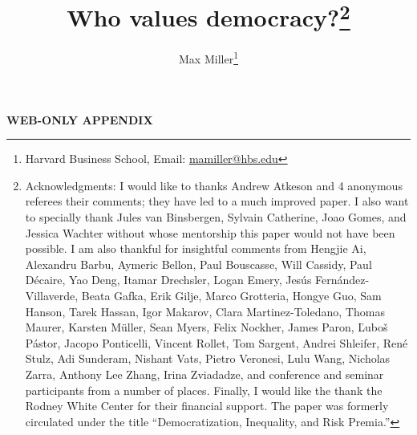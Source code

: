 \documentclass[12pt]{article}
\title{Who values democracy?\thanks{Acknowledgments: I would like to thanks Andrew Atkeson and 4 anonymous referees their comments; they have led to a much improved paper.  I also want to specially thank Jules van Binsbergen, Sylvain Catherine, Joao Gomes, and Jessica Wachter without whose mentorship this paper would not have been possible. I am also thankful for insightful comments from Hengjie Ai, Alexandru Barbu, Aymeric Bellon, Paul Bouscasse, Will Cassidy, Paul D\'{e}caire, Yao Deng,  Itamar Drechsler, Logan Emery, Jes\'{u}s Fern\'{a}ndez-Villaverde,  Beata Gafka, Erik Gilje,  Marco Grotteria, Hongye Guo, Sam Hanson, Tarek Hassan, Igor Makarov, Clara Martinez-Toledano, Thomas Maurer, Karsten M\"{u}ller, Sean Myers, Felix Nockher, James Paron, \v{L}ubo\v{s} P\'{a}stor,  Jacopo Ponticelli, Vincent Rollet, Tom Sargent, Andrei Shleifer, Ren\'{e} Stulz, Adi Sunderam, Nishant Vats, Pietro Veronesi, Lulu Wang, Nicholas Zarra, Anthony Lee Zhang, Irina Zviadadze, and conference and seminar participants from a number of places. Finally, I would like the thank the Rodney White Center for their financial support. The paper was formerly circulated under the title ``Democratization, Inequality, and Risk Premia.''}}
\author{Max Miller\thanks{Harvard Business School, Email: \href{mailto:mamiller@hbs.edu}{mamiller@hbs.edu}}	
}
\numberwithin{equation}{section}
\begin{document}
\hypersetup{linkcolor=blue}

\renewcommand{\baselinestretch}{1.3}\normalsize
\newpage
\clearpage
{}

\renewcommand{\baselinestretch}{1.3}\normalsize
\appendix
\setcounter{table}{0}
\setcounter{figure}{0}
\renewcommand\thetable{\Alph{section}.\arabic{table}}
\renewcommand\thefigure{\Alph{section}.\arabic{figure}}
\begin{center}
	\vspace*{5mm}
	\Large{\textbf{WEB-ONLY APPENDIX}\\}
	\vspace*{5mm}
\end{center}









\newpage

\renewcommand{\baselinestretch}{1}\normalsize
\footnotesize
\setlength{\bibsep}{1pt}


\end{document}
